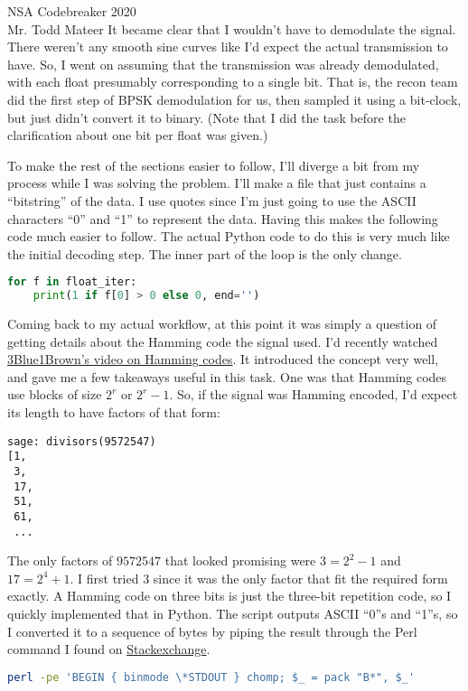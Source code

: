 \documentclass{letter}
\begin{document}
\begin{letter}{NSA Codebreaker 2020\\Mr. Todd Mateer}
\newpage
It became clear that I wouldn't have to demodulate the signal. There weren't any
smooth sine curves like I'd expect the actual transmission to have. So, I went
on assuming that the transmission was already demodulated, with each float
presumably corresponding to a single bit. That is, the recon team did the first
step of BPSK demodulation for us, then sampled it using a bit-clock, but just
didn't convert it to binary. (Note that I did the task before the clarification
about one bit per float was given.)


To make the rest of the sections easier to follow, I'll diverge a bit from my
process while I was solving the problem. I'll make a file that just contains a
``bitstring'' of the data. I use quotes since I'm just going to use the ASCII
characters ``0'' and ``1'' to represent the data. Having this makes the
following code much easier to follow. The actual Python code to do this is very
much like the initial decoding step. The inner part of the loop is the only
change.
\begin{lstlisting}[language=Python]
for f in float_iter:
    print(1 if f[0] > 0 else 0, end='')
\end{lstlisting}


Coming back to my actual workflow, at this point it was simply a question of
getting details about the Hamming code the signal used. I'd recently watched
\href{https://youtu.be/X8jsijhllIA}{3Blue1Brown's video on Hamming codes}. It
introduced the concept very well, and gave me a few takeaways useful in this
task. One was that Hamming codes use blocks of size \(2^r\) or \(2^r-1\). So, if
the signal was Hamming encoded, I'd expect its length to have factors of that
form:
\begin{lstlisting}
sage: divisors(9572547)
[1,
 3,
 17,
 51,
 61,
 ...
\end{lstlisting}


The only factors of \(\num{9572547}\) that looked promising were \(3=2^2-1\) and
\(17=2^4+1\). I first tried \(3\) since it was the only factor that fit the
required form exactly. A Hamming code on three bits is just the three-bit
repetition code, so I quickly implemented that in Python. The script outputs
ASCII ``0''s and ``1''s, so I converted it to a sequence of bytes by piping the
result through the Perl command I found on
\href{https://unix.stackexchange.com/a/212208}{Stackexchange}.

\begin{lstlisting}[language=Bash]
perl -pe 'BEGIN { binmode \*STDOUT } chomp; $_ = pack "B*", $_'
\end{lstlisting}



\end{letter}
\end{document}
